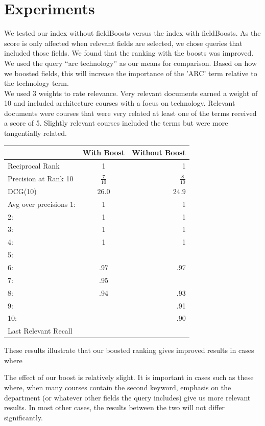 \documentclass[12pt,letterpaper]{article}
\begin{document}
\section{Experiments}

We tested our index without fieldBoosts versus the index with fieldBoosts. As the score is only affected when relevant fields are selected, we chose queries that included those fields. We found that the ranking with the boosts was improved. We used the query ``arc technology'' as our means for comparison. Based on how we boosted fields, this will increase the importance of the 'ARC' term relative to the technology term. \\

We used 3 weights to rate relevance. Very relevant documents earned a weight of 10 and included architecture courses with a focus on technology. Relevant documents were courses that were very related at least one of the terms received a score of 5. Slightly relevant courses included the terms but were more tangentially related. 

\begin{tabular}{ | l | c | r |}
	\hline
		& With Boost & Without Boost\\
	\hline
	Reciprocal Rank 			 & 1 & 1\\
	Precision at Rank 10 & $\frac{7}{10}$ & $\frac{8}{10}$ \\
	DCG(10) 								& $26.0$ & $24.9$ \\
	Avg over precisions 1: & 1 	& 1 \\
	2: 										& 1 	& 1 \\
	3: 										& 1 	& 1 \\
	4: 										& 1 	& 1 \\
	5: 										& 		&   \\
	6: 										& .97 & .97\\
	7: 										& .95 & 	 \\
	8: 										& .94 & .93 \\
	9: 										& 		& .91 \\
	10: 									&	 		& .90 \\
	Last Relevant Recall & & \\
	\hline 
\end{tabular}

\vspace{1 cm}

These results illustrate that our boosted ranking gives improved results in cases where 

The effect of our boost is relatively slight. It is important in cases such as these where, when many courses contain the second keyword, emphasis on the department (or whatever other fields the query includes) give us more relevant results. In most other cases, the results between the two will not differ significantly. 
\end{document}
